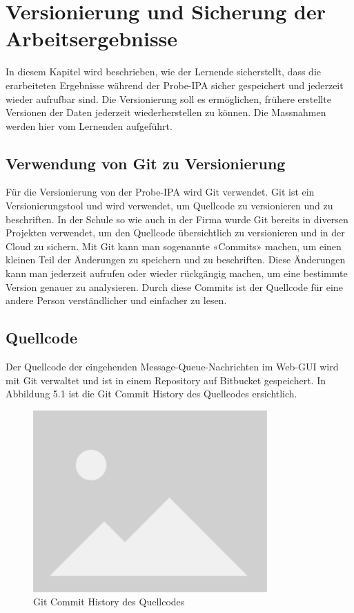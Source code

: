 \chapter{Versionierung und Sicherung der Arbeitsergebnisse}\label{ch:versionierung-und-sicherung-der-arbeitsergebnisse}
In diesem Kapitel wird beschrieben, wie der Lernende sicherstellt, dass die erarbeiteten Ergebnisse während der Probe-IPA sicher gespeichert und jederzeit wieder aufrufbar sind. Die Versionierung soll es ermöglichen, frühere erstellte Versionen der Daten jederzeit wiederherstellen zu können. Die Massnahmen werden hier vom Lernenden aufgeführt.

\section{Verwendung von Git zu Versionierung}
Für die Versionierung von der Probe-IPA wird Git verwendet. Git ist ein Versionierungstool und wird verwendet, um Quellcode zu versionieren und zu beschriften. In der Schule so wie auch in der Firma wurde Git bereits in diversen Projekten verwendet, um den Quellcode übersichtlich zu versionieren und in der Cloud zu sichern. Mit Git kann man sogenannte «Commits» machen, um einen kleinen Teil der Änderungen zu speichern und zu beschriften. Diese Änderungen kann man jederzeit aufrufen oder wieder rückgängig machen, um eine bestimmte Version genauer zu analysieren. Durch diese Commits ist der Quellcode für eine andere Person verständlicher und einfacher zu lesen.

\section{Quellcode}
Der Quellcode der eingehenden Message-Queue-Nachrichten im Web-GUI wird mit Git verwaltet und ist in einem Repository auf Bitbucket gespeichert. In Abbildung 5.1 ist die Git Commit History des Quellcodes ersichtlich.

\begin{figure}[H]
	\begin{center}
		\includegraphics[width=0.8\textwidth]{ressourcen/placeholder}
		\caption[Git Commit History des Quellcodes]{Git Commit History des Quellcodes}\label{fig:Git-Commit-History-des-Quellcodes}
	\end{center}
\end{figure}

